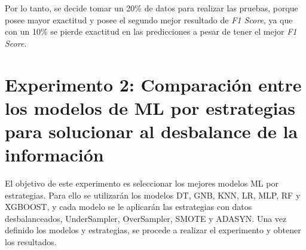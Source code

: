 Por lo tanto, se decide tomar un 20\% de datos para realizar las pruebas, porque posee mayor exactitud y posee el segundo mejor resultado de \textit{F1 Score}, ya que con un 10\% se pierde exactitud en las predicciones a pesar de tener el mejor \textit{F1 Score}.

\section{Experimento 2: Comparaci\'{o}n entre los modelos de ML por estrategias para solucionar al desbalance de la informaci\'{o}n}

  El objetivo de este experimento es seleccionar los mejores modelos ML por estrategias. Para ello se utilizar\'{a}n los modelos DT, GNB, KNN, LR, MLP, RF y XGBOOST, y cada modelo se le aplicar\'{a}n las estrategias con datos desbalanceados, UnderSampler, OverSampler, SMOTE y ADASYN. Una vez definido los modelos y estrategias, se procede a realizar el experimento y obtener los resultados.
  
